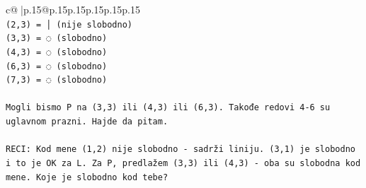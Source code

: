 \documentclass{article}
\begin{document}
{\begin{supertabular}{c@{$\;$}|p{.15\linewidth}@{}p{.15\linewidth}p{.15\linewidth}p{.15\linewidth}p{.15\linewidth}p{.15\linewidth}}
{{{\\ 
\texttt{(2,3) = │ (nije slobodno)} \\
\texttt{(3,3) = ◌ (slobodno)} \\
\texttt{(4,3) = ◌ (slobodno)} \\
\texttt{(6,3) = ◌ (slobodno)} \\
\texttt{(7,3) = ◌ (slobodno)} \\
\\ 
\texttt{Mogli bismo P na (3,3) ili (4,3) ili (6,3). Takođe redovi 4{-}6 su uglavnom prazni. Hajde da pitam.} \\
\\ 
\texttt{RECI: Kod mene (1,2) nije slobodno {-} sadrži liniju. (3,1) je slobodno i to je OK za L. Za P, predlažem (3,3) ili (4,3) {-} oba su slobodna kod mene. Koje je slobodno kod tebe?} \\
            }
        }
    }
     \\ \\


\end{supertabular}}
\end{document}
